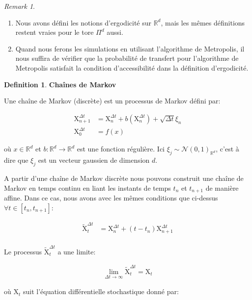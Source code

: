 \documentclass[11pt]{article}
\theoremstyle{definition}
\newtheorem{definition}{Definition}[section]
\theoremstyle{remark}
\newtheorem*{remark}{Remark}
\begin{document}
\begin{remark}
\begin{enumerate}
\item 
Nous avons défini les notions d'ergodicité sur $\mathbb{R}^d$, mais les mêmes définitions restent vraies pour le tore $\Pi^d$ aussi.
\item 
Quand nous ferons les simulations en utilisant l'algorithme de Metropolis, il nous suffira de vérifier que la probabilité de transfert pour l'algorithme de Metropolis satisfait la condition d'accessibilité dans la définition d'ergodicité.

\end{enumerate}
\end{remark}


\begin{definition}{\textbf{Chaînes de Markov}}

Une chaîne de Markov (discrète) est un processus de Markov défini par:

\begin{align}
\mathrm{X}_{n+1}^{\Delta t} &= \mathrm{X}_{n}^{\Delta t} + b(\mathrm{X}_{n}^{\Delta t}) + \sqrt{\Delta t} \xi_{n} \\
\mathrm{X}_{0}^{\Delta t} &= f(x) 
\end{align}

où $x \in \mathbb{R}^d$ et  $b: \mathbb{R}^d \to \mathbb{R}^d$ est une fonction régulière. Ici $\xi_{j} \sim \mathcal{N}(0,1)_{\mathbb{R}^d}$, c'est à dire que $\xi_{j}$ est un vecteur gaussien de dimension $d$. 
\end{definition}

A partir d'une chaîne de Markov discrète nous pouvons construit une chaîne de Markov en temps continu en liant les instants de temps $t_n$ et $t_{n+1}$ de manière affine. Dans ce cas, nous avons avec les mêmes conditions que ci-dessus $\forall t \in [t_n, t_{n+1}]$:

\begin{align}
\tilde{\mathrm{X}}_{t}^{\Delta t} &= \mathrm{X}_{n}^{\Delta t} + (t-t_n) \mathrm{X}_{n+1}^{\Delta t} \\
\end{align}

Le processus $\tilde{\mathrm{X}}_{t}^{\Delta t}$ a une limite:

\begin{align}
\lim_{\Delta t \to\infty} \tilde{\mathrm{X}}_{t}^{\Delta t} = \mathrm{X}_{t}
\end{align} 

où $\mathrm{X}_{t}$ suit l’équation différentielle stochastique donné par: 
\end{document}
